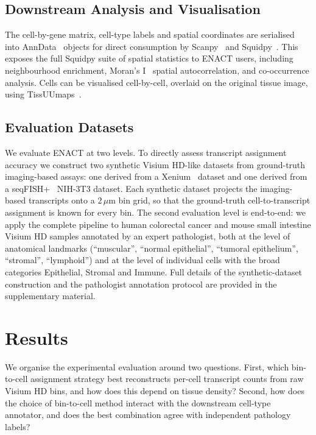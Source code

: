 \documentclass[11pt]{article}
\begin{document}
\subsection{Downstream Analysis and Visualisation}

The cell-by-gene matrix, cell-type labels and spatial coordinates are serialised into AnnData~\cite{virshup2024anndata} objects for direct consumption by Scanpy~\cite{wolf2018scanpy} and Squidpy~\cite{palla2022squidpy}. This exposes the full Squidpy suite of spatial statistics to ENACT users, including neighbourhood enrichment, Moran's I~\cite{moran1950notes} spatial autocorrelation, and co-occurrence analysis. Cells can be visualised cell-by-cell, overlaid on the original tissue image, using TissUUmaps~\cite{pielawski2023tissuumaps}.

\subsection{Evaluation Datasets}

We evaluate ENACT at two levels. To directly assess transcript assignment accuracy we construct two synthetic Visium HD-like datasets from ground-truth imaging-based assays: one derived from a Xenium~\cite{janesick2023xenium,rao2021xenium} dataset and one derived from a seqFISH+~\cite{eng2019transcriptome} NIH-3T3 dataset. Each synthetic dataset projects the imaging-based transcripts onto a $2\,\mu\mathrm{m}$ bin grid, so that the ground-truth cell-to-transcript assignment is known for every bin. The second evaluation level is end-to-end: we apply the complete pipeline to human colorectal cancer and mouse small intestine Visium HD samples annotated by an expert pathologist, both at the level of anatomical landmarks (``muscular'', ``normal epithelial'', ``tumoral epithelium'', ``stromal'', ``lymphoid'') and at the level of individual cells with the broad categories Epithelial, Stromal and Immune. Full details of the synthetic-dataset construction and the pathologist annotation protocol are provided in the supplementary material.

\section{Results}

We organise the experimental evaluation around two questions. First, which bin-to-cell assignment strategy best reconstructs per-cell transcript counts from raw Visium HD bins, and how does this depend on tissue density? Second, how does the choice of bin-to-cell method interact with the downstream cell-type annotator, and does the best combination agree with independent pathology labels?
\end{document}
